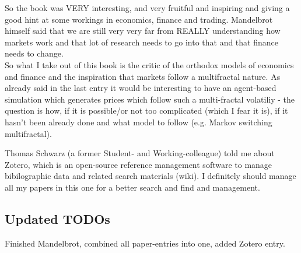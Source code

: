 \bigskip

So the book was VERY interesting, and very fruitful and inspiring and giving a good hint at some workings in economics, finance and trading. Mandelbrot himself said that we are still very very far from REALLY understanding how markets work and that lot of research needs to go into that and that finance needs to change. \\
So what I take out of this book is the critic of the orthodox models of economics and finance and the inspiration that markets follow a multifractal nature. As already said in the last entry it would be interesting to have an agent-based simulation which generates prices which follow such a multi-fractal volatiliy - the question is how, if it is possible/or not too complicated (which I fear it is), if it hasn't been already done and what model to follow (e.g. Markov switching multifractal).

\bigskip

Thomas Schwarz (a former Student- and Working-colleague) told me about Zotero, which is an open-source reference management software to manage bibilographic data and related search materials (wiki). I definitely should manage all my papers in this one for a better search and find and management.

\subsection*{Updated TODOs}
Finished Mandelbrot, combined all paper-entries into one, added Zotero entry.

